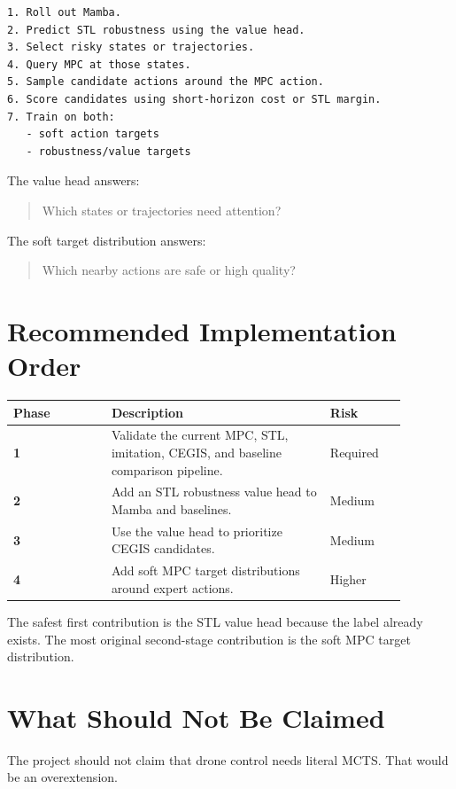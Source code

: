 \documentclass[11pt]{article}
\begin{document}
\begin{lstlisting}
1. Roll out Mamba.
2. Predict STL robustness using the value head.
3. Select risky states or trajectories.
4. Query MPC at those states.
5. Sample candidate actions around the MPC action.
6. Score candidates using short-horizon cost or STL margin.
7. Train on both:
   - soft action targets
   - robustness/value targets
\end{lstlisting}

The value head answers:

\begin{quote}
Which states or trajectories need attention?
\end{quote}

The soft target distribution answers:

\begin{quote}
Which nearby actions are safe or high quality?
\end{quote}

\section{Recommended Implementation Order}

\begin{center}
\begin{tabular}{>{\bfseries}p{0.22\linewidth}p{0.49\linewidth}p{0.17\linewidth}}
\toprule
Phase & Description & Risk \\
\midrule
1 & Validate the current MPC, STL, imitation, CEGIS, and baseline comparison pipeline. & Required \\
2 & Add an STL robustness value head to Mamba and baselines. & Medium \\
3 & Use the value head to prioritize CEGIS candidates. & Medium \\
4 & Add soft MPC target distributions around expert actions. & Higher \\
\bottomrule
\end{tabular}
\end{center}

The safest first contribution is the STL value head because the label already exists. The most original second-stage contribution is the soft MPC target distribution.

\section{What Should Not Be Claimed}

The project should not claim that drone control needs literal MCTS. That would be an overextension.
\end{document}
